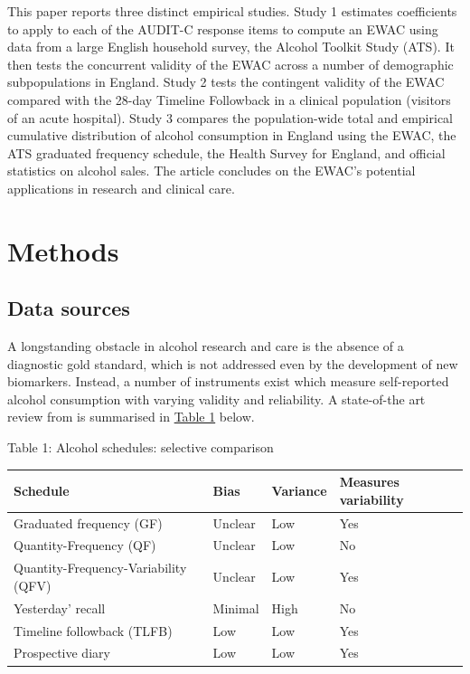 \documentclass[]{article}
\begin{document}
This paper reports three distinct empirical studies. Study 1 estimates
coefficients to apply to each of the AUDIT-C response items to compute
an EWAC using data from a large English household survey, the Alcohol
Toolkit Study (ATS). It then tests the concurrent validity of the EWAC
across a number of demographic subpopulations in England. Study 2 tests
the contingent validity of the EWAC compared with the 28-day Timeline
Followback in a clinical population (visitors of an acute hospital).
Study 3 compares the population-wide total and empirical cumulative
distribution of alcohol consumption in England using the EWAC, the ATS
graduated frequency schedule, the Health Survey for England, and
official statistics on alcohol sales. The article concludes on the
EWAC's potential applications in research and clinical care.

\hypertarget{methods}{%
\section{Methods}\label{methods}}

\hypertarget{data-sources}{%
\subsection{Data sources}\label{data-sources}}

A longstanding obstacle in alcohol research and care is the absence of a
diagnostic gold standard, which is not addressed even by the development
of new biomarkers. Instead, a number of instruments exist which measure
self-reported alcohol consumption with varying validity and reliability.
A state-of-the art review from \cite{Greenfield2000} is summarised in
\protect\hyperlink{table1}{Table 1} below.

Table 1: Alcohol schedules: selective comparison

\begin{table}[H]
\centering
\begin{tabular}{l|l|l|l}
\hline
Schedule & Bias & Variance & Measures variability\\
\hline
Graduated frequency (GF) & Unclear & Low & Yes\\
Quantity-Frequency (QF) & Unclear & Low & No\\
Quantity-Frequency-Variability (QFV) & Unclear & Low & Yes\\
Yesterday' recall & Minimal & High & No\\
Timeline followback (TLFB) & Low & Low & Yes\\
Prospective diary & Low & Low & Yes\\
\hline
\end{tabular}
\end{table}
\end{document}
